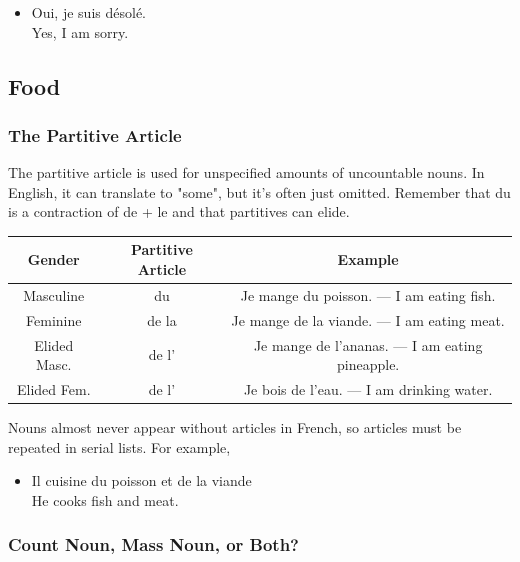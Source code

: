 \begin{itemize}
  \item  Oui, je suis d{\' e}sol{\' e}. \\ Yes, I am sorry.
\end{itemize}


\pagebreak
\subsection{Food}

\subsubsection{The Partitive Article}

The partitive article is used for unspecified amounts of uncountable nouns. In English, it can translate to "some", but it's often just omitted. Remember that du is a contraction of de + le and that partitives can elide.

\begin{center}\begin{tabular}{|c|c|c|}
\hline
\textbf{Gender} & \textbf{Partitive Article} & \textbf{Example}                               \\ \hline
Masculine       & du                         & Je mange du poisson. — I am eating fish.       \\ \hline
Feminine        & de la                      & Je mange de la viande. — I am eating meat.     \\ \hline
Elided Masc.    & de l'                      & Je mange de l'ananas. — I am eating pineapple. \\ \hline
Elided Fem.     & de l'                      & Je bois de l'eau. — I am drinking water.       \\ \hline
\end{tabular}\end{center}

Nouns almost never appear without articles in French, so articles must be repeated in serial lists.  For example,

\begin{itemize}
  \item  Il cuisine du poisson et de la viande \\ He cooks fish and meat.
\end{itemize}

\subsubsection{Count Noun, Mass Noun, or Both?}

